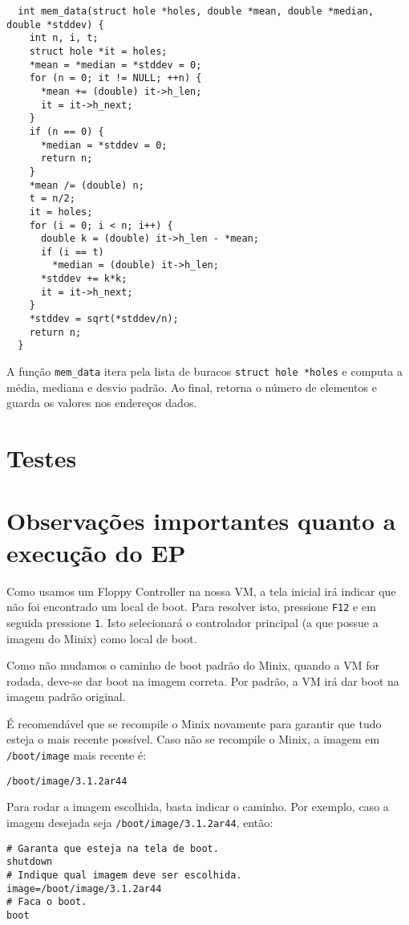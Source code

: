 \documentclass{amsart}
\theoremstyle{plain}
\newcommand{\code}[1]{\lstinline[mathescape=true]{#1}}
\begin{document}
\begin{verbatim}
  int mem_data(struct hole *holes, double *mean, double *median, double *stddev) {
    int n, i, t;
    struct hole *it = holes;
    *mean = *median = *stddev = 0;
    for (n = 0; it != NULL; ++n) {
      *mean += (double) it->h_len;
      it = it->h_next;
    }
    if (n == 0) {
      *median = *stddev = 0;
      return n;
    }
    *mean /= (double) n;
    t = n/2;
    it = holes;
    for (i = 0; i < n; i++) {
      double k = (double) it->h_len - *mean;
      if (i == t)
        *median = (double) it->h_len;
      *stddev += k*k;
      it = it->h_next;
    }
    *stddev = sqrt(*stddev/n);
    return n;
  }
\end{verbatim}

A função \code{mem_data} itera pela lista de buracos \code{struct hole *holes} e computa a média,
mediana e desvio padrão. Ao final, retorna o número de elementos e guarda os valores nos endereços
dados.

\section{Testes}

\section{Observações importantes quanto a execução do EP}

Como usamos um Floppy Controller na nossa VM, a tela inicial irá indicar que não foi encontrado um
local de boot. Para resolver isto, pressione \code{F12} e em seguida pressione \code{1}. Isto
selecionará o controlador principal (a que possue a imagem do Minix) como local de boot.

Como não mudamos o caminho de boot padrão do Minix, quando a VM for rodada, deve-se dar boot na
imagem correta. Por padrão, a VM irá dar boot na imagem padrão original.

É recomendável que se recompile o Minix novamente para garantir que tudo esteja o mais recente
possível. Caso não se recompile o Minix, a imagem em \code{/boot/image} mais recente é:

\begin{lstlisting}[frame=leftline,mathescape=true,style=nonumbers]
/boot/image/3.1.2ar44
\end{lstlisting}

Para rodar a imagem escolhida, basta indicar o caminho. Por exemplo, caso a imagem desejada seja
\code{/boot/image/3.1.2ar44}, então:

\begin{lstlisting}[frame=leftline,mathescape=true,style=nonumbers]
# Garanta que esteja na tela de boot.
shutdown
# Indique qual imagem deve ser escolhida.
image=/boot/image/3.1.2ar44
# Faca o boot.
boot
\end{lstlisting}
\end{document}
